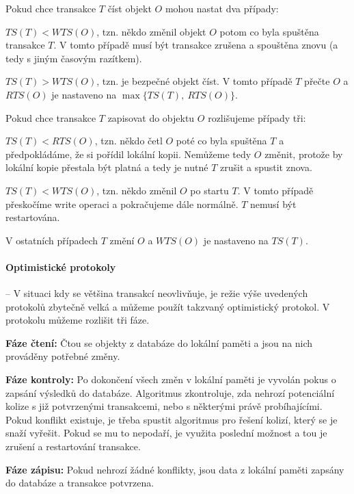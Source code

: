Pokud chce transakce $T$ číst objekt $O$ mohou nastat dva případy:
\begin{pitemize}

  \item $TS(T) < WTS(O)$, tzn. někdo změnil objekt $O$ potom co byla spuštěna
  transakce $T$. V tomto případě musí být transakce zrušena a spouštěna znovu (a
  tedy s jiným časovým razítkem).

  \item $TS(T) > WTS(O)$, tzn. je bezpečné objekt číst. V tomto případě $T$
  přečte $O$ a $RTS(O)$ je nastaveno na $\max\{TS(T),\ RTS(O)\}$.

\end{pitemize}

Pokud chce transakce $T$ zapisovat do objektu $O$ rozlišujeme případy tři:
\begin{pitemize}

  \item $TS(T) < RTS(O)$, tzn. někdo četl $O$ poté co byla spuštěna $T$ a
  předpokládáme, že si pořídil lokální kopii. Nemůžeme tedy $O$ změnit, protože
  by lokální kopie přestala být platná a tedy je nutné $T$ zrušit a spustit
  znova.

  \item $TS(T) < WTS(O)$, tzn. někdo změnil $O$ po startu $T$. V tomto případě
  přeskočíme write operaci a pokračujeme dále normálně. $T$ nemusí být
  restartována.

  \item V ostatních případech $T$ změní $O$ a $WTS(O)$ je nastaveno na $TS(T)$.
\end{pitemize}

\paragraph{Optimistické protokoly} -- V situaci kdy se většina transakcí
neovlivňuje, je režie výše uvedených protokolů zbytečně velká a můžeme použít
takzvaný optimistický protokol. V protokolu můžeme rozlišit tři fáze.
\begin{penumerate}

  \item \textbf{Fáze čtení:} Čtou se objekty z databáze do lokální paměti a jsou
  na nich prováděny potřebné změny.

  \item \textbf{Fáze kontroly:} Po dokončení všech změn v lokální paměti je
  vyvolán pokus o zapsání výsledků do databáze. Algoritmus zkontroluje, zda
  nehrozí potenciální kolize s již potvrzenými transakcemi, nebo s některými
  právě probíhajícími. Pokud konflikt existuje, je třeba spustit algoritmus pro
  řešení kolizí, který se je snaží vyřešit. Pokud se mu to nepodaří, je využita
  poslední možnost a tou je zrušení a restartování transakce.

  \item \textbf{Fáze zápisu:} Pokud nehrozí žádné konflikty, jsou data z lokální
  paměti zapsány do databáze a transakce potvrzena.

\end{penumerate}


